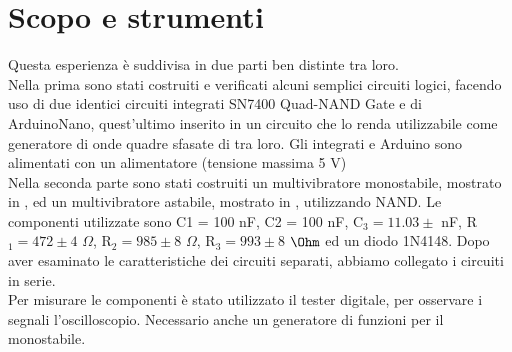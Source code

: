 \section{Scopo e strumenti}
Questa esperienza è suddivisa in due parti ben distinte tra loro.\\
Nella prima sono stati costruiti e verificati alcuni semplici circuiti logici, facendo uso di due identici circuiti integrati SN7400 Quad-NAND 
Gate e di ArduinoNano, quest'ultimo inserito in un circuito che lo renda utilizzabile come generatore di onde quadre sfasate di \pi tra loro. Gli integrati e Arduino sono alimentati con un alimentatore (tensione massima 5 V)\\
Nella seconda parte sono stati costruiti un multivibratore monostabile, mostrato in , ed un multivibratore astabile, mostrato in , utilizzando NAND. Le componenti utilizzate sono C1 = 100 nF, C2 = 100 nF, C$_3 = 11.03 \pm $ nF, R$_1 = 472 \pm 4$ $\Omega$, R$_2 = 985 \pm 8$ $\Omega$, R$_3 = 993 \pm 8$ $\Ohm$ ed un diodo 1N4148. Dopo aver esaminato le caratteristiche dei circuiti separati, abbiamo collegato i circuiti in serie.\\ %
Per misurare le componenti è stato utilizzato il tester digitale, per osservare i segnali l'oscilloscopio. Necessario anche un generatore di funzioni per il monostabile.

